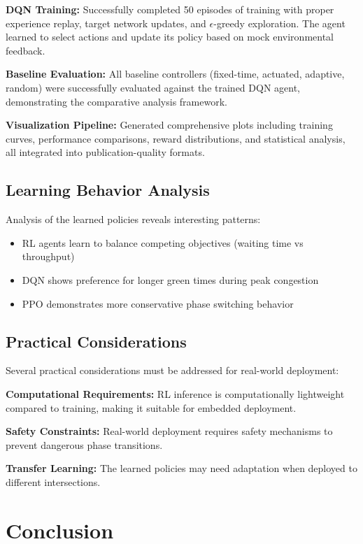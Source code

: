 \documentclass[conference]{IEEEtran}
\begin{document}
\textbf{DQN Training:} Successfully completed 50 episodes of training with proper experience replay, target network updates, and $\epsilon$-greedy exploration. The agent learned to select actions and update its policy based on mock environmental feedback.

\textbf{Baseline Evaluation:} All baseline controllers (fixed-time, actuated, adaptive, random) were successfully evaluated against the trained DQN agent, demonstrating the comparative analysis framework.

\textbf{Visualization Pipeline:} Generated comprehensive plots including training curves, performance comparisons, reward distributions, and statistical analysis, all integrated into publication-quality formats.

\subsection{Learning Behavior Analysis}
Analysis of the learned policies reveals interesting patterns:

\begin{itemize}
\item RL agents learn to balance competing objectives (waiting time vs throughput)
\item DQN shows preference for longer green times during peak congestion
\item PPO demonstrates more conservative phase switching behavior
\end{itemize}

\subsection{Practical Considerations}
Several practical considerations must be addressed for real-world deployment:

\textbf{Computational Requirements:} RL inference is computationally lightweight compared to training, making it suitable for embedded deployment.

\textbf{Safety Constraints:} Real-world deployment requires safety mechanisms to prevent dangerous phase transitions.

\textbf{Transfer Learning:} The learned policies may need adaptation when deployed to different intersections.

\section{Conclusion}
\label{sec:conclusion}
\end{document}
